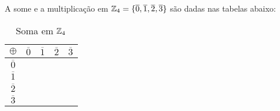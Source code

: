 \documentclass{beamer}
\begin{document}
    \begin{frame}
        \begin{exemplo}
            A some e a multiplica{\c c}{\~a}o em $\mathbb{Z}_4 = \{\overline{0},\overline{1},\overline{2},\overline{3}\}$\pause
            s\~ao dadas nas tabelas abaixo:\pause
                \begin{table}[!htb]
                  \caption{Soma em $\mathbb{Z}_4$}
                  \begin{minipage}{.5\linewidth}
                    \centering
                    \begin{tabular}{|c|c|c|c|c|} 
                        \hline
                        $\oplus$ & $\overline{0}$ & $\overline{1}$ & $\overline{2}$ & $\overline{3}$\T\\
                        \hline
                        $\overline{0}$ & \phantom{abc} & \phantom{abc} & \phantom{abc} & \phantom{abc}\T\\
                        \hline
                        $\overline{1}$ & \phantom{abc} & \phantom{abc}& \phantom{abc} & \phantom{abc}\T\\
                        \hline
                        $\overline{2}$ & \phantom{abc} & \phantom{abc} & \phantom{abc} & \phantom{abc}\T\\
                        \hline
                        $\overline{3}$ & \phantom{abc} & \phantom{abc} & \phantom{abc} & \phantom{abc}\T\\
                        \hline
                    \end{tabular}
                  \end{minipage}
                \end{table}
        \end{exemplo}
    \end{frame}
\end{document}
